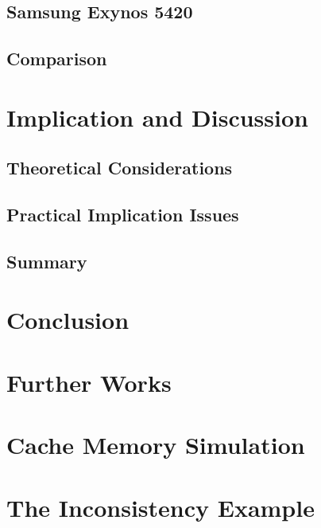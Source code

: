\documentclass[medieteknikk]{gucmasterthesis}
\begin{document}
\section{Samsung Exynos 5420}
\section{Comparison}
\chapter{Implication and Discussion}
\section{Theoretical Considerations}
\section{Practical Implication Issues}
\section{Summary}
\chapter{Conclusion}
\chapter{Further Works}





\appendix

\chapter{Cache Memory Simulation}
\chapter{The Inconsistency Example}
\end{document}
